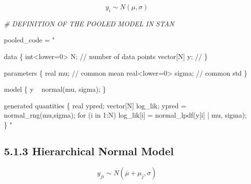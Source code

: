 \documentclass[]{article}
\newenvironment{Shaded}{\begin{snugshade}}{\end{snugshade}}
\newcommand{\StringTok}[1]{\textcolor[rgb]{0.31,0.60,0.02}{#1}}
\newcommand{\CommentTok}[1]{\textcolor[rgb]{0.56,0.35,0.01}{\textit{#1}}}
\newcommand{\NormalTok}[1]{#1}
\begin{document}
\[ y_i \sim N(\mu,\sigma)\]

\begin{Shaded}
\begin{Highlighting}[]
\CommentTok{# DEFINITION OF THE POOLED MODEL IN STAN}

\NormalTok{pooled_code =}\StringTok{ "}

\StringTok{data \{}
\StringTok{  int<lower=0> N;      // number of data points}
\StringTok{  vector[N] y;         //}
\StringTok{\}}

\StringTok{parameters \{}
\StringTok{  real mu;             // common mean}
\StringTok{  real<lower=0> sigma; // common std}
\StringTok{\}}

\StringTok{model \{}
\StringTok{  y ~ normal(mu, sigma);}
\StringTok{\}}


\StringTok{generated quantities \{ }
\StringTok{  real ypred;}
\StringTok{  vector[N] log_lik;}
\StringTok{  ypred = normal_rng(mu,sigma);}
\StringTok{  for (i in 1:N)}
\StringTok{    log_lik[i] = normal_lpdf(y[i] | mu, sigma);   }
\StringTok{\}}
\StringTok{"}
\end{Highlighting}
\end{Shaded}

\subsection{5.1.3 Hierarchical Normal
Model}\label{hierarchical-normal-model}

\[ y_{ji} \sim N(\overline{\mu}+\mu_j,\sigma)\]
\end{document}
